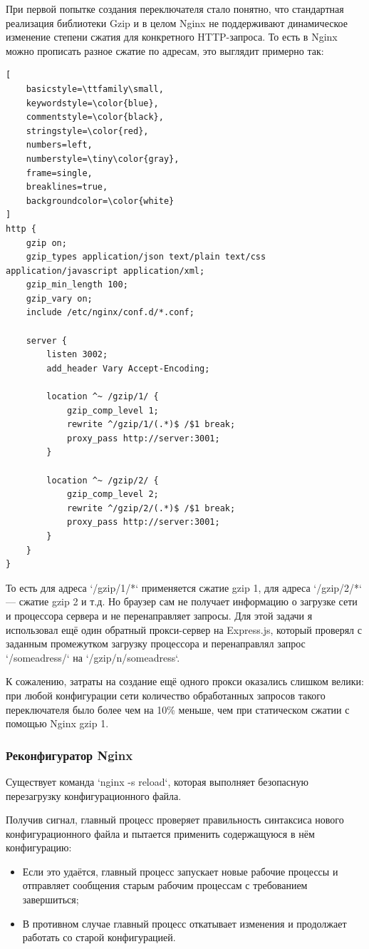\documentclass[12pt]{article}
\begin{document}
При первой попытке создания переключателя стало понятно, что стандартная реализация библиотеки Gzip и в целом Nginx не поддерживают динамическое изменение степени сжатия для конкретного HTTP-запроса. То есть в Nginx можно прописать разное сжатие по адресам, это выглядит примерно так:

\begin{lstlisting}[
    basicstyle=\ttfamily\small,
    keywordstyle=\color{blue},
    commentstyle=\color{black},
    stringstyle=\color{red},
    numbers=left,
    numberstyle=\tiny\color{gray},
    frame=single,
    breaklines=true,
    backgroundcolor=\color{white}
]
http {
    gzip on;
    gzip_types application/json text/plain text/css application/javascript application/xml;
    gzip_min_length 100;
    gzip_vary on;
    include /etc/nginx/conf.d/*.conf;

    server {
        listen 3002;
        add_header Vary Accept-Encoding;

        location ^~ /gzip/1/ {
            gzip_comp_level 1;
            rewrite ^/gzip/1/(.*)$ /$1 break;
            proxy_pass http://server:3001;
        }

        location ^~ /gzip/2/ {
            gzip_comp_level 2;
            rewrite ^/gzip/2/(.*)$ /$1 break;
            proxy_pass http://server:3001;
        }
    }
}
\end{lstlisting}

То есть для адреса `/gzip/1/*` применяется сжатие gzip 1, для адреса `/gzip/2/*` — сжатие gzip 2 и т.д.
Но браузер сам не получает информацию о загрузке сети и процессора сервера и не перенаправляет запросы.
Для этой задачи я использовал ещё один обратный прокси-сервер на Express.js, который проверял
с заданным промежутком загрузку процессора и перенаправлял запрос `/someadress/` на `/gzip/n/someadress`.

К сожалению, затраты на создание ещё одного прокси оказались слишком велики: при любой конфигурации сети
количество обработанных запросов такого переключателя было более чем на 10\% меньше, чем при статическом сжатии с помощью Nginx gzip 1.

\subsubsection{Реконфигуратор Nginx}

Существует команда `nginx -s reload`, которая выполняет безопасную перезагрузку конфигурационного файла.

Получив сигнал, главный процесс проверяет правильность синтаксиса нового конфигурационного файла и пытается применить содержащуюся в нём конфигурацию:
\begin{itemize}
    \item Если это удаётся, главный процесс запускает новые рабочие процессы и отправляет сообщения старым рабочим процессам с требованием завершиться;
    \item В противном случае главный процесс откатывает изменения и продолжает работать со старой конфигурацией.
\end{itemize}
\end{document}
